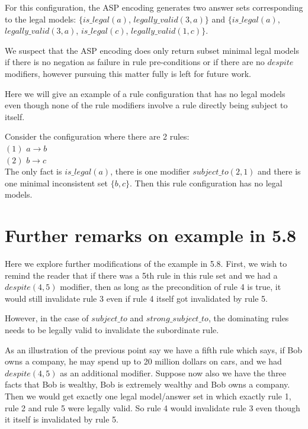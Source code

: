 For this configuration, the ASP encoding generates two answer sets
corresponding to the legal models: \newline $\{is\_legal(a)$,
$legally\_valid(3,a)\}$ and $\{is\_legal(a)$, $legally\_valid(3,a)$,
$is\_legal(c)$, $legally\_valid(1,c)\}$.

We suspect that the ASP encoding does only return subset minimal legal models
if there is no negation as failure in rule pre-conditions or if there are no
$despite$ modifiers, however pursuing this matter fully is left for future
work.

Here we will give an example of a rule configuration that has no legal models
even though none of the rule modifiers involve a rule directly being subject
to itself.

Consider the configuration where there are 2 rules:\\ $(1)$ $a\rightarrow b$\\
$(2)$ $b\rightarrow c$\\
The only fact is $is\_legal(a)$, there is one modifier $subject\_to(2,1)$ and there is one minimal inconsistent set $\{b,c\}$. Then this rule configuration has no legal models. 

\section{Further remarks on example in 5.8}

Here we explore further modifications of the example in 5.8. First, we wish to remind the reader that if there was a 5th rule in this rule set and we had a $despite(4,5)$ modifier, then as long as the precondition of rule 4 is true, it would still invalidate rule 3 even if rule 4 itself got invalidated by rule 5.

However, in the case of $subject\_to$ and $strong\_subject\_to$, the dominating rules needs to be legally valid to invalidate the subordinate rule. 

As an illustration of the previous point say we have a fifth rule which says, if Bob owns a company, he may spend up to 20 million dollars on cars, and we had $despite(4,5)$ as an additional modifier. Suppose now also we have the three facts that Bob is wealthy, Bob is extremely wealthy and Bob owns a company. Then we would get exactly one legal model/answer set in which exactly rule 1, rule 2 and rule 5 were legally valid. So rule 4 would invalidate rule 3 even though it itself is invalidated by rule 5. 





